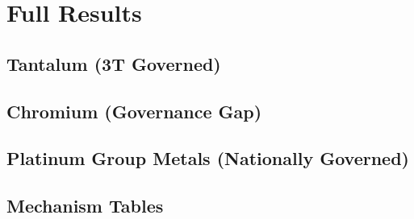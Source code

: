 \documentclass[11pt]{article}
\begin{document}
\section{Full Results}
\setcounter{table}{0}
\setcounter{figure}{0}



\subsection{Tantalum (3T Governed)}







\subsection{Chromium (Governance Gap)}







\subsection{Platinum Group Metals (Nationally Governed)}







\subsection{Mechanism Tables}






\end{document}

